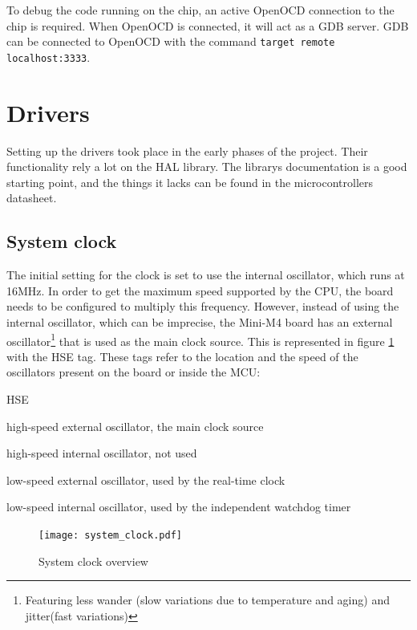 To debug the code running on the chip, an active OpenOCD connection to the chip
is required. When OpenOCD is connected, it will act as a GDB server. GDB can
be connected to OpenOCD with the command \texttt{target remote localhost:3333}.


\section{Drivers}
Setting up the drivers took place in the early phases of the project. Their
functionality rely a lot on the HAL library. The library\textquotesingle s documentation is a good starting
point, and the things it lacks can be found in the
microcontroller\textquotesingle s datasheet.


\subsection{System clock}
\label{ssec:system_clock}
The initial setting for the clock is set to use the internal oscillator,
which runs at 16MHz. In order to get the maximum speed supported by the
CPU, the board needs to be configured to multiply this frequency.
However, instead of using the internal oscillator, which can be imprecise,
the Mini-M4
board has an external oscillator\footnote{Featuring less wander (slow
 variations due to temperature and aging) and jitter(fast variations)}
that is used as the main clock source.
This is represented in figure \ref{fig:system_clock} with the HSE
tag. These tags refer to the location and the speed of the oscillators
present on the board or inside the MCU:

\begin{labeling}{HSE}
	\item[\textbf{HSE}]
		high-speed external oscillator, the main clock source
	\item[\textbf{HSI}]
		high-speed internal oscillator, not used
	\item[\textbf{LSE}]
		low-speed external oscillator, used by the real-time clock
	\item[\textbf{LSI}]
		low-speed internal oscillator, used by the independent watchdog
		timer
\end{labeling}

\begin{figure}[H]
\centering
\texttt{[image: system\_clock.pdf]}
\caption{System clock overview \cite{reference_manual_216}}
\label{fig:system_clock}
\end{figure}

